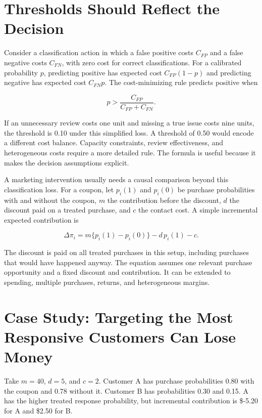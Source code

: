 \hypertarget{M07-thresholds-should-reflect-the-decision}{%
\section{Thresholds Should Reflect the
Decision}\label{M07-thresholds-should-reflect-the-decision}}

\noindent Consider a classification action in which a false positive costs
\(C_{FP}\) and a false negative costs \(C_{FN}\), with zero cost for
correct classifications. For a calibrated probability \(p\), predicting
positive has expected cost \(C_{FP}(1-p)\) and predicting negative has
expected cost \(C_{FN}p\). The cost-minimizing rule predicts positive
when

\[
p>\frac{C_{FP}}{C_{FP}+C_{FN}}.
\]

If an unnecessary review costs one unit and missing a true issue costs
nine units, the threshold is 0.10 under this simplified loss. A
threshold of 0.50 would encode a different cost balance. Capacity
constraints, review effectiveness, and heterogeneous costs require a
more detailed rule. The formula is useful because it makes the decision
assumptions explicit.

A marketing intervention usually needs a causal comparison beyond this
classification loss. For a coupon, let \(p_i(1)\) and \(p_i(0)\) be
purchase probabilities with and without the coupon, \(m\) the
contribution before the discount, \(d\) the discount paid on a treated
purchase, and \(c\) the contact cost. A simple incremental expected
contribution is

\[
\Delta\pi_i=m\{p_i(1)-p_i(0)\}-d\,p_i(1)-c.
\]

The discount is paid on all treated purchases in this setup, including
purchases that would have happened anyway. The equation assumes one
relevant purchase opportunity and a fixed discount and contribution. It
can be extended to spending, multiple purchases, returns, and
heterogeneous margins.

\hypertarget{M07-case-study-targeting-the-most-responsive-customers-can-lose-money}{%
\section{Case Study: Targeting the Most Responsive Customers Can Lose
Money}\label{M07-case-study-targeting-the-most-responsive-customers-can-lose-money}}

\noindent Take \(m=40\), \(d=5\), and \(c=2\). Customer A has purchase
probabilities 0.80 with the coupon and 0.78 without it. Customer B has
probabilities 0.30 and 0.15. A has the higher treated response
probability, but incremental contribution is \$-5.20 for A and \$2.50
for B.

